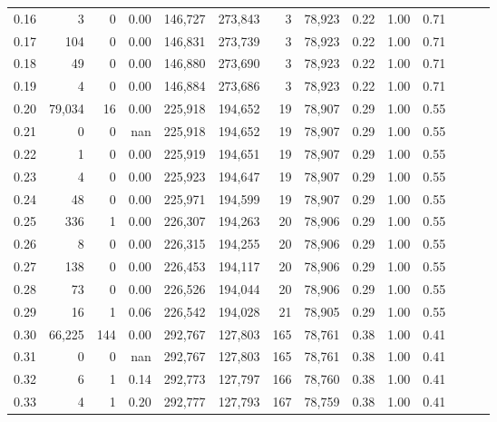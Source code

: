 \begin{tabular}{rrrrrrrrrrrrrr}
0.16 &       3 &       0 &  0.00 &  146,727 &  273,843 &       3 &  78,923 &  0.22 &  1.00 &      0.71 \\
0.17 &     104 &       0 &  0.00 &  146,831 &  273,739 &       3 &  78,923 &  0.22 &  1.00 &      0.71 \\
0.18 &      49 &       0 &  0.00 &  146,880 &  273,690 &       3 &  78,923 &  0.22 &  1.00 &      0.71 \\
0.19 &       4 &       0 &  0.00 &  146,884 &  273,686 &       3 &  78,923 &  0.22 &  1.00 &      0.71 \\
0.20 &  79,034 &      16 &  0.00 &  225,918 &  194,652 &      19 &  78,907 &  0.29 &  1.00 &      0.55 \\
0.21 &       0 &       0 &   nan &  225,918 &  194,652 &      19 &  78,907 &  0.29 &  1.00 &      0.55 \\
0.22 &       1 &       0 &  0.00 &  225,919 &  194,651 &      19 &  78,907 &  0.29 &  1.00 &      0.55 \\
0.23 &       4 &       0 &  0.00 &  225,923 &  194,647 &      19 &  78,907 &  0.29 &  1.00 &      0.55 \\
0.24 &      48 &       0 &  0.00 &  225,971 &  194,599 &      19 &  78,907 &  0.29 &  1.00 &      0.55 \\
0.25 &     336 &       1 &  0.00 &  226,307 &  194,263 &      20 &  78,906 &  0.29 &  1.00 &      0.55 \\
0.26 &       8 &       0 &  0.00 &  226,315 &  194,255 &      20 &  78,906 &  0.29 &  1.00 &      0.55 \\
0.27 &     138 &       0 &  0.00 &  226,453 &  194,117 &      20 &  78,906 &  0.29 &  1.00 &      0.55 \\
0.28 &      73 &       0 &  0.00 &  226,526 &  194,044 &      20 &  78,906 &  0.29 &  1.00 &      0.55 \\
0.29 &      16 &       1 &  0.06 &  226,542 &  194,028 &      21 &  78,905 &  0.29 &  1.00 &      0.55 \\
0.30 &  66,225 &     144 &  0.00 &  292,767 &  127,803 &     165 &  78,761 &  0.38 &  1.00 &      0.41 \\
0.31 &       0 &       0 &   nan &  292,767 &  127,803 &     165 &  78,761 &  0.38 &  1.00 &      0.41 \\
0.32 &       6 &       1 &  0.14 &  292,773 &  127,797 &     166 &  78,760 &  0.38 &  1.00 &      0.41 \\
0.33 &       4 &       1 &  0.20 &  292,777 &  127,793 &     167 &  78,759 &  0.38 &  1.00 &      0.41 \\

\end{tabular}
